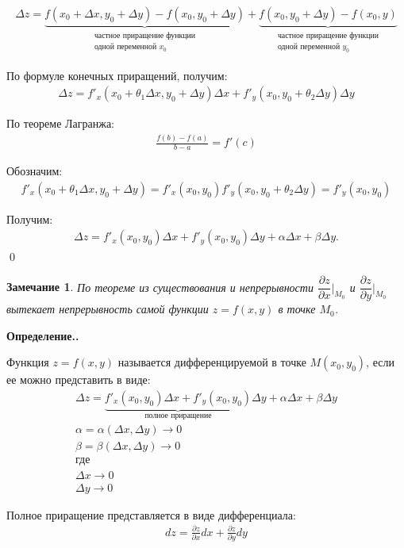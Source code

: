 \documentclass[a4paper,12pt,oneside]{extbook}
\newcommand{\newpar}{$ $\par\nobreak\ignorespaces}
\newenvironment{definition}[1][]{\noindent\textbf{Определение.\if\relax\detokenize{#1}\relax\else\;#1.\fi}\newpar}{}
\theoremstyle{numbered}
\theoremstyle{unnumbered}
\theoremstyle{named}
\theoremstyle{unnumbered}
\theoremstyle{named}
\theoremstyle{named}
\theoremstyle{named}
\newtheorem*{note}{Замечание}
\renewenvironment{proof}{{\noindent\textbf{Доказательство.}}}{\qed}
\begin{document}
\begin{proof}
    \begin{gather*}
        \Delta z =
        \underbrace{f(x_0 + \Delta x, y_0 + \Delta y) - f(x_0, y_0 + \Delta y)}_{\substack{\text{частное приращение функции} \\ \text{одной переменной \(x_0\)}}}
        +
        \underbrace{f(x_0, y_0 + \Delta y) - f(x_0, y)}_{\substack{\text{частное приращение функции} \\ \text{одной переменной \(y_0\)}}}
    \end{gather*}

    По формуле конечных приращений, получим:
    \begin{gather*}
        \Delta z = f'_x(x_0 + \theta_1 \Delta x, y_0 + \Delta y) \Delta x + f'_y(x_0, y_0 + \theta_2 \Delta y) \Delta y
    \end{gather*}

    По теореме Лагранжа:
    \begin{gather*}
        \frac{f(b) - f(a)}{b - a} = f'(c)
    \end{gather*}

    Обозначим:
    \begin{gather*}
        f'_x(x_0 + \theta_1 \Delta x, y_0 + \Delta y) = f'_x(x_0, y_0)
        f'_y(x_0, y_0 + \theta_2 \Delta y) = f'_y(x_0, y_0)
    \end{gather*}

    Получим:
    \begin{gather*}
        \Delta z = f'_x(x_0, y_0) \Delta x + f'_y(x_0, y_0) \Delta y + \alpha \Delta x + \beta \Delta y.
    \end{gather*}
\end{proof}

\begin{note}
    По теореме из существования и непрерывности \(\dfrac{\partial z}{\partial x} \Big|_{M_0}\) и \(\dfrac{\partial z}{\partial y} \Big|_{M_0}\) вытекает непрерывность самой функции \(z = f(x, y)\) в точке \(M_0\).
\end{note}

\begin{definition}
    Функция \(z = f(x, y)\) называется дифференцируемой в точке \(M(x_0, y_0)\), если ее можно представить в виде:
    \begin{gather*}
        \Delta z = \underbrace{f'_x(x_0, y_0) \Delta x + f'_y(x_0, y_0)}_\text{полное приращение} \Delta y + \alpha \Delta x + \beta \Delta y \\
        \alpha = \alpha(\Delta x, \Delta y) \to 0 \\
        \beta = \beta(\Delta x, \Delta y) \to 0 \\
        \text{где} \\
        \Delta x \to 0 \\
        \Delta y \to 0
    \end{gather*}

    Полное приращение представляется в виде дифференциала:
    \begin{gather*}
        dz = \frac{\partial z}{\partial x} dx + \frac{\partial z}{\partial y} dy
    \end{gather*}
\end{definition}
\end{document}

